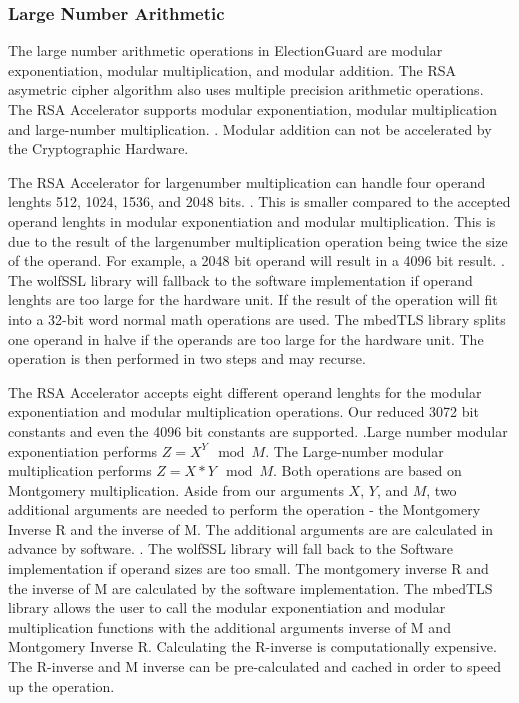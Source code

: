 \subsubsection{Large Number Arithmetic}
The large number arithmetic operations in ElectionGuard are modular exponentiation, modular multiplication, and modular addition. The RSA asymetric cipher algorithm also uses multiple precision arithmetic operations. The RSA Accelerator supports modular exponentiation, modular multiplication and large-number multiplication. \cite[598]{esp32-ref}. Modular addition can not be accelerated by the Cryptographic Hardware. 

The RSA Accelerator for large\-number multiplication can handle four operand lenghts 512, 1024, 1536, and 2048 bits. \cite[598]{esp32-ref}. This is smaller compared to the accepted operand lenghts in modular exponentiation and modular multiplication. This is due to the result of the large\-number multiplication operation being twice the size of the operand. For example, a 2048 bit operand will result in a 4096 bit result. \cite[598-599]{esp32-ref}. The wolfSSL library will fallback to the software implementation if operand lenghts are too large for the hardware unit. If the result of the operation will fit into a 32-bit word normal math operations are used. The mbedTLS library splits one operand in halve if the operands are too large for the hardware unit. The operation is then performed in two steps and may recurse.


The RSA Accelerator accepts eight different operand lenghts for the modular exponentiation and modular multiplication operations. Our reduced 3072 bit constants and even the 4096 bit constants are supported. \cite[598]{esp32-ref}.Large number modular exponentiation performs \(Z = X ^ Y \mod M\). The Large-number modular multiplication performs \(Z = X * Y \mod M\). Both operations are based on Montgomery multiplication. Aside from our arguments \(X\), \(Y\), and \(M\), two additional arguments are needed to perform the operation - the Montgomery Inverse R and the inverse of M. The additional arguments are are calculated in advance by software. \cite[598-599]{esp32-ref}. The wolfSSL library will fall back to the Software implementation if operand sizes are too small. The montgomery inverse R and the inverse of M are calculated by the software implementation. The mbedTLS library allows the user to call the modular exponentiation and modular multiplication functions with the additional arguments inverse of M and Montgomery Inverse R. Calculating the R-inverse is computationally expensive. The R-inverse and M inverse can be pre-calculated and cached in order to speed up the operation. 


